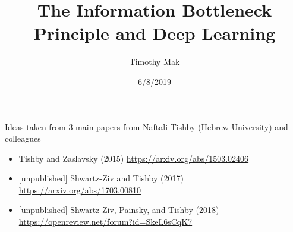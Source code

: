 \documentclass{beamer}
\title[]{The Information Bottleneck Principle and Deep Learning} %
\author{Timothy Mak} %
\institute[Fano Labs] %
{
	Fano Labs, Hong Kong \\ %
	\medskip
}
\date{6/8/2019} %
\begin{document}
	
	\begin{frame}
	\titlepage %
	\end{frame}

\begin{frame}
Ideas taken from 3 main papers from Naftali Tishby (Hebrew University) and colleagues 
\begin{itemize}
	\item Tishby and Zaslavsky (2015) \url{https://arxiv.org/abs/1503.02406}
	\item{} [unpublished] Shwartz-Ziv and Tishby (2017) \url{https://arxiv.org/abs/1703.00810}
	\item{} [unpublished] Shwartz-Ziv, Painsky, and Tishby (2018) \url{https://openreview.net/forum?id=SkeL6sCqK7}
\end{itemize}

\end{frame}


%

\end{document}
